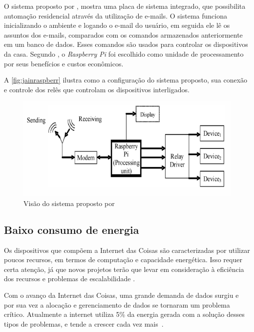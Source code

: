 O sistema proposto por , mostra uma placa de sistema integrado, que possibilita automação residencial através da utilização de e-mails. O sistema funciona inicializando o ambiente e logando o e-mail do usuário, em seguida ele lê os assuntos dos e-mails, comparados com os comandos armazenados anteriormente em um banco de dados. Esses comandos são usados para controlar os dispositivos da casa. Segundo , o \textit{Raspberry Pi} foi escolhido como unidade de processamento por seus benefícios e custos econômicos. 

A \autoref{fig:jainraspberr} ilustra como a configuração do sistema proposto, sua conexão e controle dos relês que controlam os dispositivos interligados. 

 \begin{figure}[H]
	\centering
    	\caption{\label{fig:jainraspberr} Visão do sistema proposto por  }
		\includegraphics[width = 1\textwidth]	{resources/jainraspberry}
\end{figure}


\subsection{Baixo consumo de energia}

Os dispositivos que compõem a Internet das Coisas são caracterizadas por utilizar poucos recursos, em termos de computação e capacidade energética. Isso requer certa atenção, já que novos projetos terão que levar em consideração à eficiência dos recursos e problemas de escalabilidade \cite{atzori2010internet}.

Com o avanço da Internet das Coisas, uma grande demanda de dados surgiu e por sua vez a alocação e gerenciamento de dados se tornaram um problema crítico. Atualmente a internet utiliza 5\% da energia gerada com a solução desses tipos de problemas, e tende a crescer cada vez mais~\cite{Gubbi:2013}.



